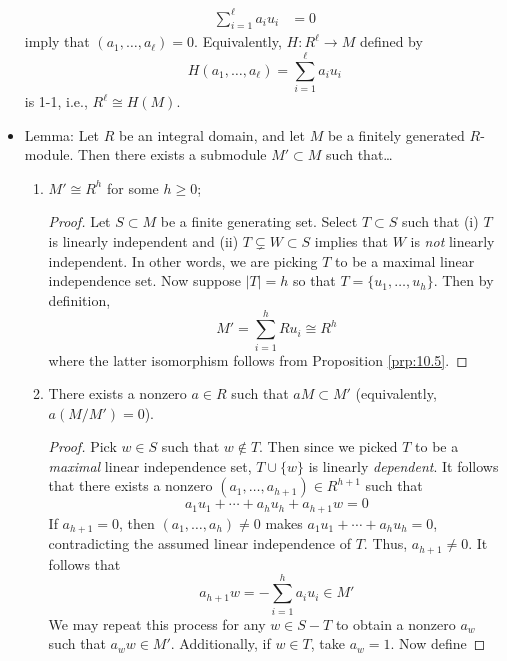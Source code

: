 \documentclass[../notes.tex]{subfiles}
\begin{document}
\begin{itemize}
\begin{align*}
        \sum_{i=1}^\ell a_iu_i &= 0
    \end{align*}
    imply that $(a_1,\dots,a_\ell)=0$. Equivalently, $H:R^\ell\to M$ defined by
    \begin{equation*}
        H(a_1,\dots,a_\ell) = \sum_{i=1}^\ell a_iu_i
    \end{equation*}
    is 1-1, i.e., $R^\ell\cong H(M)$.
    \item Lemma: Let $R$ be an integral domain, and let $M$ be a finitely generated $R$-module. Then there exists a submodule $M'\subset M$ such that\dots
    \begin{enumerate}[label={(\roman*)}]
        \item $M'\cong R^h$ for some $h\geq 0$;
        \begin{proof}
            Let $S\subset M$ be a finite generating set. Select $T\subset S$ such that (i) $T$ is linearly independent and (ii) $T\subsetneq W\subset S$ implies that $W$ is \emph{not} linearly independent. In other words, we are picking $T$ to be a maximal linear independence set. Now suppose $|T|=h$ so that $T=\{u_1,\dots,u_h\}$. Then by definition,
            \begin{equation*}
                M' = \sum_{i=1}^hRu_i
                \cong R^h
            \end{equation*}
            where the latter isomorphism follows from Proposition \ref{prp:10.5}.
        \end{proof}
        \item There exists a nonzero $a\in R$ such that $aM\subset M'$ (equivalently, $a(M/M')=0$).
        \begin{proof}
            Pick $w\in S$ such that $w\notin T$. Then since we picked $T$ to be a \emph{maximal} linear independence set, $T\cup\{w\}$ is linearly \emph{dependent}. It follows that there exists a nonzero $(a_1,\dots,a_{h+1})\in R^{h+1}$ such that
            \begin{equation*}
                a_1u_1+\cdots+a_hu_h+a_{h+1}w = 0
            \end{equation*}
            If $a_{h+1}=0$, then $(a_1,\dots,a_h)\neq 0$ makes $a_1u_1+\cdots+a_hu_h=0$, contradicting the assumed linear independence of $T$. Thus, $a_{h+1}\neq 0$. It follows that
            \begin{equation*}
                a_{h+1}w = -\sum_{i=1}^ha_iu_i \in M'
            \end{equation*}
            We may repeat this process for any $w\in S-T$ to obtain a nonzero $a_w$ such that $a_ww\in M'$. Additionally, if $w\in T$, take $a_w=1$. Now define

\end{proof}
\end{enumerate}
\end{itemize}
\end{document}

